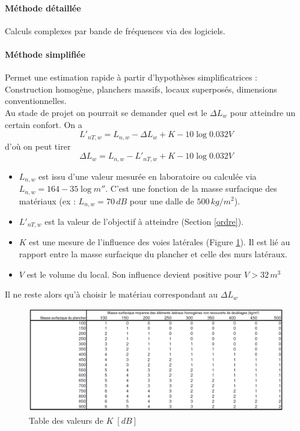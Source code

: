 \documentclass[11pt]{report}
\begin{document}
\paragraph{Méthode détaillée} Calculs complexes par bande de fréquences via des logiciels. 

\paragraph{Méthode simplifiée} Permet une estimation rapide à partir d'hypothèses simplificatrices : Construction homogène, planchers massifs, locaux superposés, dimensions conventionnelles.\\
Au stade de projet on pourrait se demander quel est le $\Delta L_w$ pour atteindre un certain confort.
On a 
$$L'_{nT,w} = L_{n,w} - \Delta L_w + K - 10 \log 0.032 V$$
 d'où on peut tirer 
$$\Delta L_w = L_{n,w} - L'_{nT,w} + K - 10 \log 0.032 V$$
 
\begin{itemize}
\item $L_{n,w}$ est issu d'une valeur mesurée en laboratoire ou calculée via $L_{n,w} = 164- 35 \log m''$. C'est une fonction de la masse surfacique des matériaux (ex : $L_{n,w} = 70\,dB$ pour une dalle de $500\,kg/m^2$).
\item $L'_{nT,w}$ est la valeur de l'objectif à atteindre (Section \ref{ordre}).
\item $K$ est une mesure de l'influence des voies latérales (Figure \ref{k}). Il est lié au rapport entre la masse surfacique du plancher et celle des murs latéraux.

\item $V$ est le volume du local. Son influence devient positive pour $V > 32 \,m^3$
\end{itemize}

\vspace{5mm}
Il ne reste alors qu'à choisir le matériau correspondant au $\Delta L_w$

\begin{figure}[ht]
\centering
\includegraphics[width=0.9\linewidth]{k}
\caption{Table des valeurs de $K\;[dB]$}
\label{k}
\end{figure}
\end{document}
